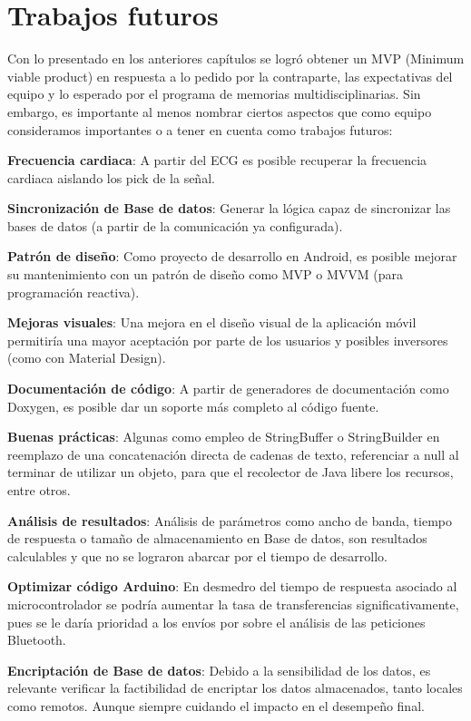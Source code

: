\section{Trabajos futuros}

Con lo presentado en los anteriores capítulos se logró obtener un MVP (Minimum viable product) en respuesta a lo pedido por la contraparte, las expectativas del equipo y lo esperado por el programa de memorias multidisciplinarias. Sin embargo, es importante al menos nombrar ciertos aspectos que como equipo consideramos importantes o a tener en cuenta como trabajos futuros:

\textbf{Frecuencia cardiaca}: A partir del ECG es posible recuperar la frecuencia cardiaca aislando los pick de la señal.

\textbf{Sincronización de Base de datos}: Generar la lógica capaz de sincronizar las bases de datos (a partir de la comunicación ya configurada).

\textbf{Patrón de diseño}: Como proyecto de desarrollo en Android, es posible mejorar su mantenimiento con un patrón de diseño como MVP\cite{mvp} o MVVM\cite{mvvm} (para programación reactiva).

\textbf{Mejoras visuales}: Una mejora en el diseño visual de la aplicación móvil permitiría una mayor aceptación por parte de los usuarios y posibles inversores (como con Material Design).

\textbf{Documentación de código}: A partir de generadores de documentación como Doxygen, es posible dar un soporte más completo al código fuente.

\textbf{Buenas prácticas}: Algunas como empleo de StringBuffer o StringBuilder en reemplazo de una concatenación directa de cadenas de texto, referenciar a null al terminar de utilizar un objeto, para que el recolector de Java libere los recursos, entre otros.

\textbf{Análisis de resultados}: Análisis de parámetros como ancho de banda, tiempo de respuesta o tamaño de almacenamiento en Base de datos, son resultados calculables y que no se lograron abarcar por el tiempo de desarrollo.

\textbf{Optimizar código Arduino}: En desmedro del tiempo de respuesta asociado al microcontrolador se podría aumentar la tasa de transferencias significativamente, pues se le daría prioridad a los envíos por sobre el análisis de las peticiones Bluetooth.

\textbf{Encriptación de Base de datos}: Debido a la sensibilidad de los datos, es relevante verificar la factibilidad de encriptar los datos almacenados, tanto locales como remotos. Aunque siempre cuidando el impacto en el desempeño final.

